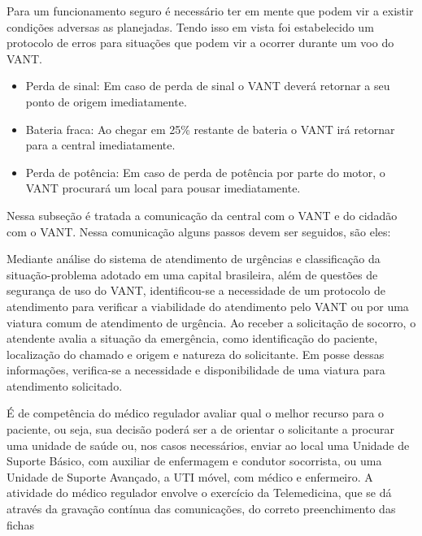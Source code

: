 	
Para um funcionamento seguro é necessário ter em mente que podem vir a existir condições adversas as planejadas. Tendo isso em vista foi estabelecido um protocolo de erros para situações que podem vir a ocorrer durante um voo do VANT.

\begin{itemize}
 \item Perda de sinal: Em caso de perda de sinal o VANT deverá retornar a seu ponto de origem imediatamente.
 
 \item Bateria fraca: Ao chegar em 25\% restante de bateria o VANT irá retornar para a central imediatamente.

 \item Perda de potência: Em caso de perda de potência por parte do motor, o VANT procurará um local para pousar imediatamente.

\end{itemize}

Nessa subseção é tratada a comunicação da central com o VANT e do cidadão com o VANT.
Nessa comunicação alguns passos devem ser seguidos, são eles:

Mediante análise do sistema de atendimento de urgências e classificação da situação-problema adotado em uma capital brasileira, além de questões de segurança de uso do VANT, identificou-se a necessidade de um protocolo de atendimento para verificar a viabilidade do atendimento pelo VANT ou por uma viatura comum de atendimento de urgência.
Ao receber a solicitação de socorro, o atendente avalia a situação da emergência, como identificação do paciente, localização do chamado e origem e natureza do solicitante. Em posse dessas informações, verifica-se a necessidade e disponibilidade de uma viatura para atendimento solicitado.


É de competência do médico regulador avaliar qual o melhor recurso para o paciente, ou seja, sua decisão poderá ser a de orientar o solicitante a procurar uma unidade de saúde ou, nos casos necessários, enviar ao local uma Unidade de Suporte Básico, com auxiliar de enfermagem e condutor socorrista, ou uma Unidade de Suporte Avançado, a UTI móvel, com médico e enfermeiro.
A atividade do médico regulador envolve o exercício da Telemedicina, que se dá através da gravação contínua das comunicações, do correto preenchimento das fichas


